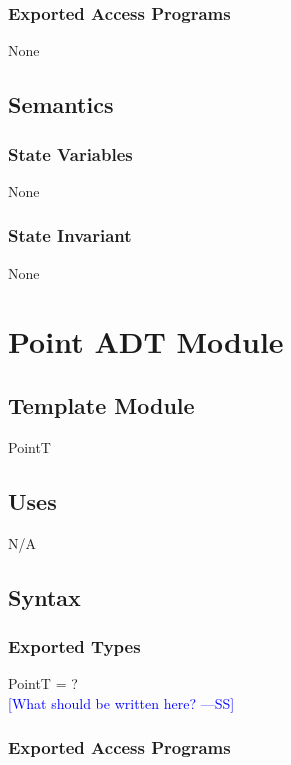 \documentclass[12pt]{article}
\newcommand{\authornote}[3]{\textcolor{#1}{[#3 ---#2]}}
\newcommand{\authornote}[3]{}
\newcommand{\wss}[1]{\authornote{blue}{SS}{#1}}
\begin{document}
\subsubsection* {Exported Access Programs}

None

\subsection* {Semantics}

\subsubsection* {State Variables}

None

\subsubsection* {State Invariant}

None

\newpage

\section* {Point ADT Module}

\subsection*{Template Module}

PointT

\subsection* {Uses}

N/A

\subsection* {Syntax}

\subsubsection* {Exported Types}
PointT = ?\\
\wss{What should be written here?}

\subsubsection* {Exported Access Programs}
\end{document}
